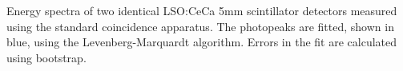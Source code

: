 \label{fig:photopeaks} Energy spectra of two identical LSO:CeCa 5mm scintillator detectors measured using the standard coincidence apparatus. The photopeaks are fitted, shown in blue, using  the Levenberg-Marquardt algorithm. Errors in the fit are calculated using bootstrap.